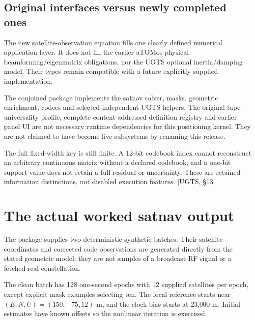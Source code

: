 \documentclass[11pt,a4paper]{article}
\newcommand{\uRef}[1]{\textcolor{muted}{[UGTS, #1]}}
\begin{document}
\subsection{Original interfaces versus newly completed ones}
The new satellite-observation equation fills one clearly defined numerical application layer. It does not fill
the earlier aTOMos physical beamforming/eigenmatrix obligations, nor the UGTS optional inertia/damping model.
Their types remain compatible with a future explicitly supplied implementation.

The conjoined package implements the satnav solver, masks, geometric enrichment, codecs and selected
independent UGTS helpers. The original tape-universality profile, complete content-addressed definition
registry and earlier panel UI are not necessary runtime dependencies for this positioning kernel. They are
not claimed to have become live subsystems by renaming this release.

The full fixed-width key is still finite. A 12-bit codebook index cannot reconstruct an arbitrary continuous
matrix without a declared codebook, and a one-bit support value does not retain a full residual or uncertainty.
These are retained information distinctions, not disabled execution features. \uRef{\S13}
\clearpage

\section{The actual worked satnav output}
The package supplies two deterministic synthetic batches. Their satellite coordinates and corrected code
observations are generated directly from the stated geometric model; they are not samples of a broadcast
RF signal or a fetched real constellation.

The clean batch has 128 one-second epochs with 12 supplied satellites per epoch, except explicit mask
examples selecting ten. The local reference starts near $(E,N,U)=(150,-75,12)$ m, and the clock bias starts
at 23,000 m. Initial estimates have known offsets so the nonlinear iteration is exercised.
\end{document}
